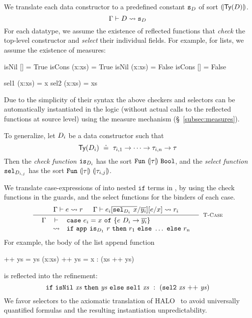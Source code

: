%
We translate each data constructor to a
predefined \smtlan constant ${\texttt{s}_{D}}$ of
sort ${(\!|\mathsf{Ty}({D})|\!)}$.
$$
	 \Gamma\vdash D \rightsquigarrow \texttt{s}_{D} 
$$
%
For each datatype, we assume the existence of reflected functions that
\emph{check} the top-level constructor
and \emph{select} their individual fields.
%
For example, for lists, we assume the existence of measures:
%
\begin{mcode}
  isNil []     = True     isCons (x:xs) = True
  isNil (x:xs) = False    isCons []     = False

  sel1 (x:xs)  = x        sel2 (x:xs)   = xs
\end{mcode}
%
Due to the simplicity of their syntax the above checkers and selectors
can be automatically instantiated in the logic
(\ie without actual calls to the reflected functions at source level)
using the measure mechanism (\S~\ref{subsec:measures}).

To generalize, let $D_i$ be a data constructor such that
$$
\mathsf{Ty}({D_i}) \ \doteq\  \tau_{i,1} \rightarrow \dots \rightarrow \tau_{i,n} \rightarrow \tau
$$
Then the \emph{check function}
${\texttt{is}_{{D_i}}}$ has the sort
$\mathtt{Fun}\ {(\!|\tau|\!)}\ {\texttt{Bool}}$,
and the \emph{select function}
${\texttt{sel}_{{D}_{i,j}}}$ has the sort
$\mathtt{Fun}\ {(\!|\tau|\!)}\ {(\!|\tau_{i,j}|\!)}$.
%


%
We translate case-expressions
of \corelan into nested $\mathtt{if}$
terms in \smtlan, by using the check
functions in the guards, and the
select functions for the binders
of each case.
$$
\inference{
	\tologicshort{\env}{e}{\typ_e}{\pred}{\embed{\typ_e}}{\smtenv}{\axioms} &&
	\tologicshort{\env}{e_i\subst{\overline{y_i}}{\overline{\selector{\dc_i}{}\ x}}\subst{x}{e}}{\typ}{\pred_i}{\embed{\typ}}{\smtenv}{\axioms_i}
}{
	\tologicshorttwolines{\env}{\ecase{x}{e}{\dc_i}{\overline{y_i}}{e_i}}{\typ}
	 {\eif{\smtappname{}{}\ \checkdc{\dc_1}\ \pred}{\pred_1}{\ldots} \ \mathtt{else}\ \pred_n}{\embed{\typ}}{\smtenv}
	 {\andaxioms{\axioms}{\axioms_i}}
}[\lgcase]
$$
%
For example, the body of the list append function
%
\begin{code}
  []     ++ ys = ys
  (x:xs) ++ ys = x : (xs ++ ys)
\end{code}
%
is reflected into the \smtlan refinement:
%
$$
\ite{\mathtt{isNil}\ \mathit{xs}}
    {\mathit{ys}}
    {\mathtt{sel1}\ \mathit{xs}\
       \dcons\
       (\mathtt{sel2}\ \mathit{xs} \ \mathtt{++}\  \mathit{ys})}
$$
%
We favor selectors to the axiomatic translation of
HALO~\citep{halo} to avoid
universally quantified formulas and the resulting
instantiation unpredictability.


